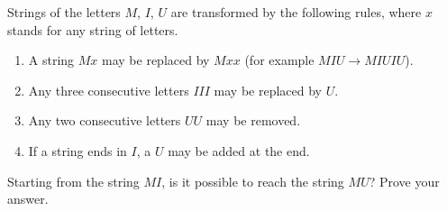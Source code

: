 Strings of the letters $M$, $I$, $U$ are transformed by the following rules, where $x$ stands for any string of letters.
\begin{enumerate}
\item A string $Mx$ may be replaced by $Mxx$ (for example $MIU\to MIUIU$).
\item Any three consecutive letters $III$ may be replaced by $U$.
\item Any two consecutive letters $UU$ may be removed.
\item If a string ends in $I$, a $U$ may be added at the end.
\end{enumerate}
Starting from the string $MI$, is it possible to reach the string $MU$? Prove your answer.
